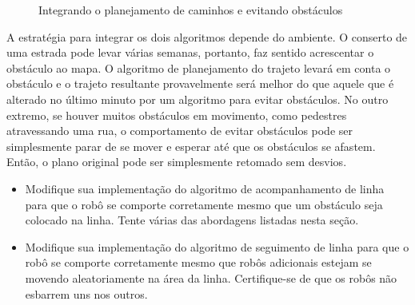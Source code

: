 {\begin{figure}
\begin{center}
\caption{Integrando o planejamento de caminhos e evitando obstáculos}\label{fig.integrate-pp}
\end{center}
\end{figure}

A estratégia para integrar os dois algoritmos depende do ambiente. O conserto de uma estrada pode levar várias semanas, portanto, faz sentido acrescentar o obstáculo ao mapa. O algoritmo de planejamento do trajeto levará em conta o obstáculo e o trajeto resultante provavelmente será melhor do que aquele que é alterado no último minuto por um algoritmo para evitar obstáculos. No outro extremo, se houver muitos obstáculos em movimento, como pedestres atravessando uma rua, o comportamento de evitar obstáculos pode ser simplesmente parar de se mover e esperar até que os obstáculos se afastem. Então, o plano original pode ser simplesmente retomado sem desvios.

\begin{framed}
\begin{itemize}
\item Modifique sua implementação do algoritmo de acompanhamento de linha para que o robô se comporte corretamente mesmo que um obstáculo seja colocado na linha. Tente várias das abordagens listadas nesta seção.
\item Modifique sua implementação do algoritmo de seguimento de linha para que o robô se comporte corretamente mesmo que robôs adicionais estejam se movendo aleatoriamente na área da linha. Certifique-se de que os robôs não esbarrem uns nos outros.
\end{itemize}
\end{framed}

}
